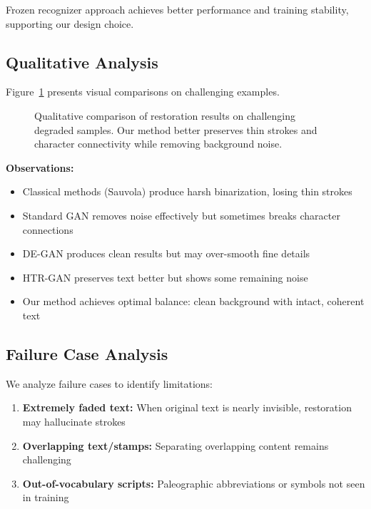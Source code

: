 \documentclass[journal]{IEEEtran}
\begin{document}
Frozen recognizer approach achieves better performance and training stability, supporting our design choice.

\subsection{Qualitative Analysis}

Figure~\ref{fig:qualitative_results} presents visual comparisons on challenging examples.

\begin{figure}[!t]
\centering
\caption{Qualitative comparison of restoration results on challenging degraded samples. Our method better preserves thin strokes and character connectivity while removing background noise.}
\label{fig:qualitative_results}
\end{figure}

\textbf{Observations:}
\begin{itemize}
    \item Classical methods (Sauvola) produce harsh binarization, losing thin strokes
    \item Standard GAN removes noise effectively but sometimes breaks character connections
    \item DE-GAN produces clean results but may over-smooth fine details
    \item HTR-GAN preserves text better but shows some remaining noise
    \item Our method achieves optimal balance: clean background with intact, coherent text
\end{itemize}

\subsection{Failure Case Analysis}

We analyze failure cases to identify limitations:

\begin{enumerate}
    \item \textbf{Extremely faded text:} When original text is nearly invisible, restoration may hallucinate strokes
    \item \textbf{Overlapping text/stamps:} Separating overlapping content remains challenging
    \item \textbf{Out-of-vocabulary scripts:} Paleographic abbreviations or symbols not seen in training
\end{enumerate}
\end{document}
